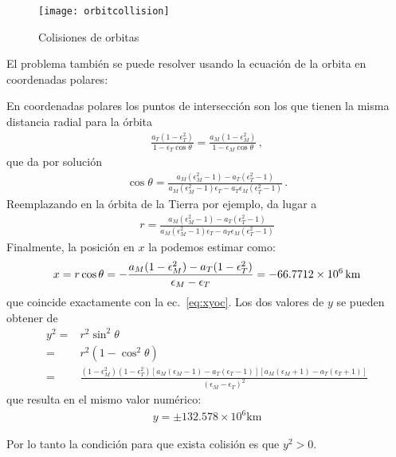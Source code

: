 \begin{frame}
\begin{figure}
  \centering
  \texttt{[image: orbitcollision]}
  \caption{Colisiones de orbitas}
  \label{fig:orbitcollision}
\end{figure}

El problema también se puede resolver usando la ecuación de la orbita en coordenadas polares:

En coordenadas polares los puntos de intersección son los que tienen la misma distancia radial para la órbita
\begin{align*}
  \frac{a_T \left(1-\epsilon _T^2\right)}{1-\epsilon_T\cos\theta }=  \frac{a_M \left(1-\epsilon_M^2\right)}{1-\epsilon _M\cos\theta }\,,
\end{align*}
que da por solución
\begin{align*}
\cos\theta= \frac{a_M \left(\epsilon_M^2-1\right)-a_T \left(\epsilon _T^2-1\right)}{a_M 
  \left(\epsilon_M^2-1\right) \epsilon_T-a_T \epsilon_M\left(\epsilon _T^2-1\right)}\,.
\end{align*}
Reemplazando en la órbita de la Tierra por ejemplo, da lugar a
\begin{align*}
  r=\frac{a_M \left(\epsilon_M^2-1\right)-a_T\left(\epsilon_T^2-1\right)}{a_M
    \left(\epsilon_M^2-1\right) \epsilon_T-a_T\epsilon_M\left(\epsilon _T^2-1\right)}
\end{align*}
Finalmente, la posición en $x$ la podemos estimar como:
\begin{align*}
  x=r\cos\theta=-\frac{a_M(1-\epsilon_M^2)-a_T(1-\epsilon_T^2)}{\epsilon_M-\epsilon_T}
   =-\SI{66.7712E{6}}{\kilo\meter}
\end{align*}
que coincide exactamente con la ec.~\eqref{eq:xyoc}. Los dos valores de $y$ se pueden obtener de
\begin{align*}
y^2=&r^2\sin^2\theta\nonumber\\
=&r^2(1-\cos^2\theta)\nonumber\\
=&  \frac{\left(1-\epsilon_M^2 \right)\left(1-\epsilon_T^2\right)\left[a_M \left(\epsilon_M-1\right)-a_T
   \left(\epsilon_T-1\right)\right] \left[a_M
   \left(\epsilon_M+1\right)-a_T \left(\epsilon_T+1\right)\right]}{
 \left(\epsilon_M-\epsilon_T\right)^2}
\end{align*}
que resulta en el mismo valor numérico:
\begin{align*}
  y=\pm{132.578\times10^{6}}\si{\kilo\meter}
\end{align*}

Por lo tanto la condición para que exista colisión es que $y^2>0$.
  
\end{frame}

